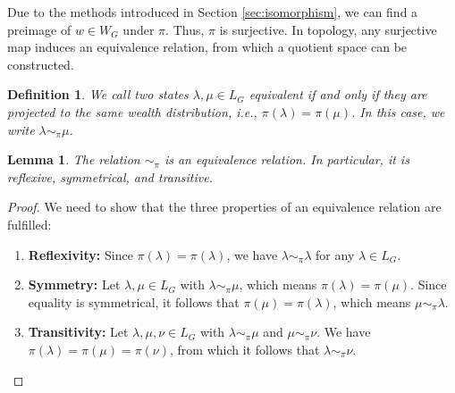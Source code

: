\documentclass[10pt,twocolumn]{article}
\newtheorem{definition}{Definition}[section]
\newtheorem{lemma}[theorem]{Lemma}
\begin{document}
  

Due to the methods introduced in Section \ref{sec:isomorphism}, we can find a preimage of \( w \in W_G \) under \( \pi \).  
Thus, \( \pi \) is surjective.  
In topology, any surjective map induces an equivalence relation, from which a quotient space can be constructed.  

\begin{definition}
We call two states \( \lambda, \mu \in L_G \) equivalent if and only if they are projected to the same wealth distribution, i.e., \( \pi(\lambda) = \pi(\mu) \).  
In this case, we write \( \lambda \sim_{\pi} \mu \).
\end{definition}

\begin{lemma}
The relation \( \sim_{\pi} \) is an equivalence relation. In particular, it is reflexive, symmetrical, and transitive.
\end{lemma}

\begin{proof}
We need to show that the three properties of an equivalence relation are fulfilled:
\begin{enumerate}
    \item \textbf{Reflexivity:} Since \( \pi(\lambda) = \pi(\lambda) \), we have \( \lambda \sim_{\pi} \lambda \) for any \( \lambda \in L_G \).
    \item \textbf{Symmetry:} Let \( \lambda, \mu \in L_G \) with \( \lambda \sim_{\pi} \mu \), which means \( \pi(\lambda) = \pi(\mu) \). Since equality is symmetrical, it follows that \( \pi(\mu) = \pi(\lambda) \), which means \( \mu \sim_{\pi} \lambda \).
    \item \textbf{Transitivity:} Let \( \lambda, \mu, \nu \in L_G \) with \( \lambda \sim_{\pi} \mu \) and \( \mu \sim_{\pi} \nu \). We have \( \pi(\lambda) = \pi(\mu) = \pi(\nu) \), from which it follows that \( \lambda \sim_{\pi} \nu \).
\end{enumerate}
\end{proof}
\end{document}
